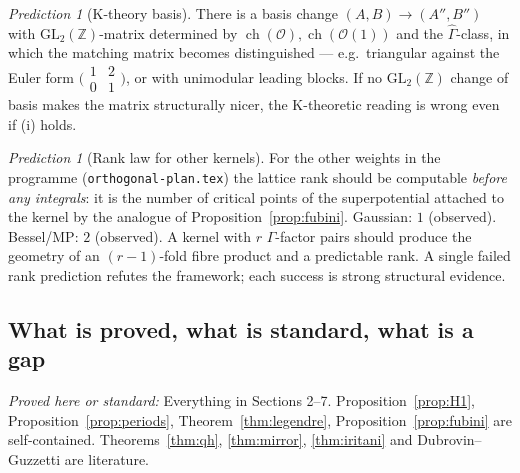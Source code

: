 \documentclass[11pt]{article}
\theoremstyle{definition}
\theoremstyle{remark}
\newtheorem{prediction}[proposition]{Prediction}
\newcommand{\Z}{\mathbb{Z}}
\newcommand{\ch}{\operatorname{ch}}
\newcommand{\G}{\Gamma}
\begin{document}
\begin{prediction}[K-theory basis]\label{pred:K}
There is a basis change $(A, B) \to (A'', B'')$ with
$\mathrm{GL}_2(\Z)$-matrix determined by
$\ch(\mathcal O), \ch(\mathcal O(1))$ and the $\widehat\G$-class,
in which the matching matrix becomes distinguished --- e.g.\
triangular against the Euler form
$\bigl(\begin{smallmatrix}1&2\\0&1\end{smallmatrix}\bigr)$, or
with unimodular leading blocks. If no $\mathrm{GL}_2(\Z)$ change
of basis makes the matrix structurally nicer, the K-theoretic
reading is wrong even if (i) holds.
\end{prediction}

\begin{prediction}[Rank law for other kernels]\label{pred:rank}
For the other weights in the programme
(\texttt{orthogonal-plan.tex}) the lattice rank should be
computable \emph{before any integrals}: it is the number of
critical points of the superpotential attached to the kernel by
the analogue of Proposition~\ref{prop:fubini}. Gaussian: $1$
(observed). Bessel/MP: $2$ (observed). A kernel with $r$
$\G$-factor pairs should produce the geometry of an $(r-1)$-fold
fibre product and a predictable rank. A single failed rank
prediction refutes the framework; each success is strong
structural evidence.
\end{prediction}

\subsection{What is proved, what is standard, what is a gap}
\label{sec:gaps}

\emph{Proved here or standard:} Everything in Sections 2--7.
Proposition~\ref{prop:H1}, Proposition~\ref{prop:periods},
Theorem~\ref{thm:legendre}, Proposition~\ref{prop:fubini} are
self-contained. Theorems~\ref{thm:qh}, \ref{thm:mirror},
\ref{thm:iritani} and Dubrovin--Guzzetti are literature.
\end{document}
